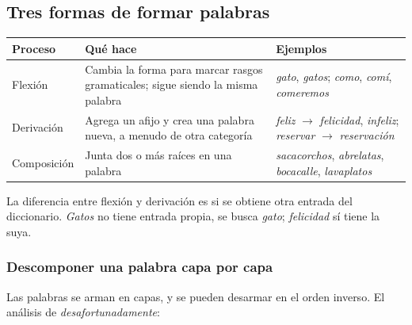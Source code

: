 \documentclass[11pt,letterpaper]{article}
\begin{document}
\subsection*{Tres formas de formar palabras}

\begin{center}
\small
\begin{tabular}{l>{\raggedright\arraybackslash}p{4.6cm}%
                 >{\raggedright\arraybackslash}p{5.4cm}}
    \toprule
    \textbf{Proceso} & \textbf{Qué hace} & \textbf{Ejemplos} \\
    \midrule
    Flexión & Cambia la forma para marcar rasgos gramaticales; sigue
              siendo la misma palabra
            & \textit{gato}, \textit{gatos}; \textit{como},
              \textit{comí}, \textit{comeremos} \\
    \addlinespace
    Derivación & Agrega un afijo y crea una palabra nueva, a menudo de
                 otra categoría
               & \textit{feliz} $\to$ \textit{felicidad},
                 \textit{infeliz}; \textit{reservar} $\to$
                 \textit{reservación} \\
    \addlinespace
    Composición & Junta dos o más raíces en una palabra
                & \textit{sacacorchos}, \textit{abrelatas},
                  \textit{bocacalle}, \textit{lavaplatos} \\
    \bottomrule
\end{tabular}
\end{center}

La diferencia entre flexión y derivación es si se obtiene otra entrada
del diccionario. \textit{Gatos} no tiene entrada propia, se busca
\textit{gato}; \textit{felicidad} sí tiene la suya.

\subsubsection*{Descomponer una palabra capa por capa}

Las palabras se arman en capas, y se pueden desarmar en el orden
inverso. El análisis de \textit{desafortunadamente}:

\begin{center}
\end{center}
\end{document}
